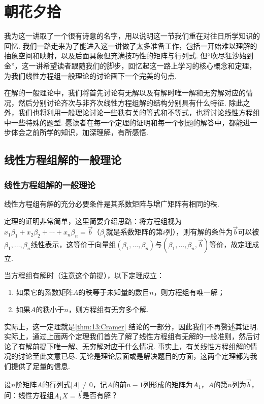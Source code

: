\chapter{朝花夕拾}

我为这一讲取了一个很有诗意的名字，用以说明这一节我们重在对往日所学知识的回忆. 我们一路走来为了能进入这一讲做了太多准备工作，包括一开始难以理解的抽象空间和映射，以及后面具象但充满技巧性的矩阵与行列式. 但``吹尽狂沙始到金''，这一讲希望读者跟随我们的脚步，回忆起这一路上学习的核心概念和定理，为我们线性方程组一般理论的讨论画下一个完美的句点.

在解的一般理论中，我们将首先讨论有无解以及有解时唯一解和无穷解对应的情况，然后分别讨论齐次与非齐次线性方程组解的结构分别具有什么特征. 除此之外，我们也将利用一般理论讨论一些秩有关的等式和不等式，也将讨论线性方程组中一些特殊的题型. 愿读者在每一个定理的证明和每一个例题的解答中，都能进一步体会之前所学的知识，加深理解，有所感悟.

\section{线性方程组解的一般理论}

\subsection{线性方程组解的一般理论}

\begin{theorem}[线性方程组有解的充要条件] \label{thm:15:有解条件}
    线性方程组有解的充分必要条件是其系数矩阵与增广矩阵有相同的秩.
\end{theorem}
定理的证明非常简单，这里简要介绍思路：将方程组视为$x_1\beta_1+x_2\beta_2+\cdots+x_n\beta_n=\vec{b}$（$\beta_i$就是系数矩阵的第$i$列），则有解的条件为$\vec{b}$可以被$\beta_1,\ldots,\beta_n$线性表示，这等价于向量组$(\beta_1,\ldots,\beta_n)$与$(\beta_1,\ldots,\beta_n,\vec{b})$等价，故定理成立.

\begin{theorem} \label{thm:15:方程组解}
    当方程组有解时（注意这个前提），以下定理成立：
    \begin{enumerate}
        \item 如果它的系数矩阵$A$的秩等于未知量的数目$n$，则方程组有唯一解；

        \item 如果$A$的秩小于$n$，则方程组有无穷多个解.
    \end{enumerate}
\end{theorem}
实际上，这一定理就是\autoref{thm:13:Cramer} 结论的一部分，因此我们不再赘述其证明. 实际上，通过上面两个定理我们首先了解了线性方程组有无解的一般准则，然后讨论了有解前提下唯一解、无穷解对应于什么情况. 事实上，有关线性方程组解的情况的讨论至此文意已尽. 无论是理论层面或是解决题目的方面，这两个定理都为我们提供了足量的信息.
\begin{example}
    设$n$阶矩阵$A$的行列式$|A|\neq 0$，记$A$的前$n-1$列形成的矩阵为$A_1$，$A$的第$n$列为$\vec{b}$，问：线性方程组$A_1X=\vec{b}$是否有解？
\end{example}

